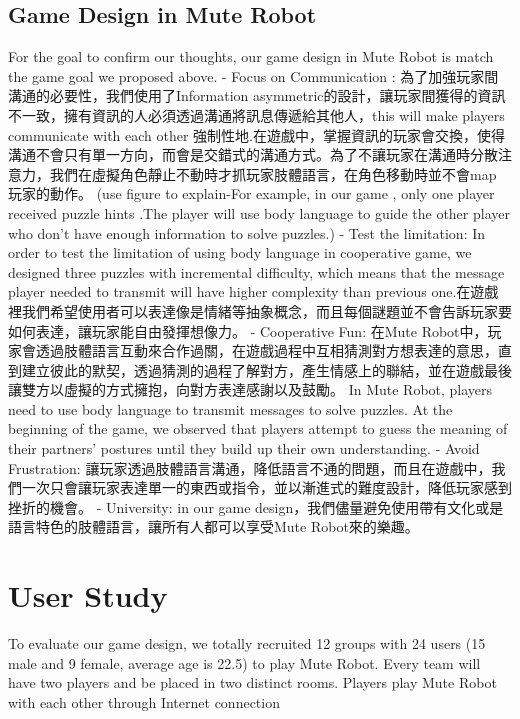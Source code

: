 \documentclass{sigchi}
\begin{document}
\subsection{Game Design in Mute Robot}

For the goal to confirm our thoughts, our game design in Mute Robot is match the game goal we proposed above.
- Focus on Communication : 為了加強玩家間溝通的必要性，我們使用了Information asymmetric的設計，讓玩家間獲得的資訊不一致，擁有資訊的人必須透過溝通將訊息傳遞給其他人，this will make players communicate with each other 強制性地.在遊戲中，掌握資訊的玩家會交換，使得溝通不會只有單一方向，而會是交錯式的溝通方式。為了不讓玩家在溝通時分散注意力，我們在虛擬角色靜止不動時才抓玩家肢體語言，在角色移動時並不會map 玩家的動作。
(use figure to explain-For example, in our game , only one player received puzzle hints .The player will use body language to guide the other player who don’t have enough information to solve puzzles.)
- Test the limitation: In order to test the limitation of using body language in cooperative game, we designed three puzzles with incremental difficulty, which means that the message player needed to transmit will have higher complexity than previous one.在遊戲裡我們希望使用者可以表達像是情緒等抽象概念，而且每個謎題並不會告訴玩家要如何表達，讓玩家能自由發揮想像力。
- Cooperative Fun: 在Mute Robot中，玩家會透過肢體語言互動來合作過關，在遊戲過程中互相猜測對方想表達的意思，直到建立彼此的默契，透過猜測的過程了解對方，產生情感上的聯結，並在遊戲最後讓雙方以虛擬的方式擁抱，向對方表達感謝以及鼓勵。
In Mute Robot, players need to use body language to transmit messages to solve puzzles. At the beginning of the game, we observed that players attempt to guess the meaning of their partners’ postures until they build up their own understanding. 
- Avoid Frustration: 讓玩家透過肢體語言溝通，降低語言不通的問題，而且在遊戲中，我們一次只會讓玩家表達單一的東西或指令，並以漸進式的難度設計，降低玩家感到挫折的機會。
- University: in our game design，我們儘量避免使用帶有文化或是語言特色的肢體語言，讓所有人都可以享受Mute Robot來的樂趣。

\section{User Study}
To evaluate our game design, we totally recruited 12 groups with 24 users (15 male and 9 female, average age is 22.5) to play Mute Robot.  Every team will have two players and be placed in two distinct rooms. Players play Mute Robot with each other through Internet connection
\end{document}
